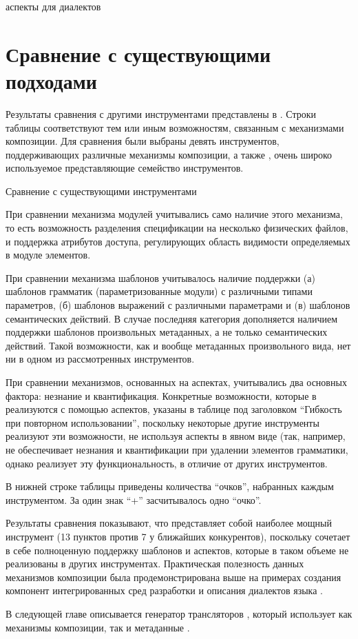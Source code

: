 аспекты для диалектов

\chapter{Сравнение с существующими подходами}

Результаты сравнения \GRM{} с другими инструментами представлены в . Строки таблицы соответствуют тем или иным возможностям, связанным с механизмами композиции. Для сравнения были выбраны девять инструментов, поддерживающих различные механизмы композиции, а также , очень широко используемое представляющие семейство инструментов.

\begin{table}[htb]
	\centering
\newcommand{\dissonly}[1]{#1}

	\caption{Сравнение \GRM{} с существующими инструментами}\label{GrmTable}
\end{table}

При сравнении механизма модулей учитывались само наличие этого механизма, то есть возможность разделения спецификации на несколько физических файлов, и поддержка атрибутов доступа, регулирующих область видимости определяемых в модуле элементов.

При сравнении механизма шаблонов учитывалось наличие поддержки 
	(а) шаблонов грамматик (параметризованные модули) с различными типами параметров, 
	(б) шаблонов выражений с различными параметрами и
	(в) шаблонов семантических действий. 
В случае \GRM{} последняя категория дополняется наличием поддержки шаблонов произвольных метаданных, а не только семантических действий. Такой возможности, как и вообще метаданных произвольного вида, нет ни в одном из рассмотренных инструментов.

При сравнении механизмов, основанных на аспектах, учитывались два основных фактора: незнание и квантификация. Конкретные возможности, которые в \GRM{} реализуются с помощью аспектов, указаны в таблице под заголовком ``Гибкость при повторном использовании'', поскольку некоторые другие инструменты реализуют эти возможности, не используя аспекты в явном виде (так, например,  не обеспечивает незнания и квантификации при удалении элементов грамматики, однако реализует эту функциональность, в отличие от других инструментов.

В нижней строке таблицы приведены количества ``очков'', набранных каждым инструментом. За один знак ``+'' засчитывалось одно ``очко''.

Результаты сравнения показывают, что \GRM{} представляет собой наиболее мощный инструмент (13 пунктов против 7 у ближайших конкурентов), поскольку сочетает в себе полноценную поддержку шаблонов и аспектов, которые в таком объеме не реализованы в других инструментах. Практическая полезность данных механизмов композиции была продемонстрирована выше на примерах создания компонент интегрированных сред разработки и описания диалектов языка .

В следующей главе описывается генератор трансляторов \ATF{}, который использует как механизмы композиции, так и метаданные \GRM{}.